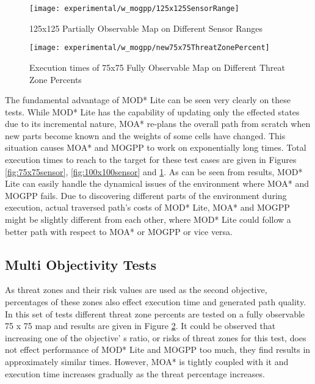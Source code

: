 \begin{figure}
\centering
\texttt{[image: experimental/w\_mogpp/125x125SensorRange]}
\caption{125x125 Partially Observable Map on Different Sensor Ranges}
\label{fig:125x125sensor}
\end{figure}

\begin{figure}
\centering
\texttt{[image: experimental/w\_mogpp/new75x75ThreatZonePercent]}
\caption{Execution times of 75x75 Fully Observable Map on Different Threat Zone Percents}
\label{fig:tzratio}
\end{figure}


The fundamental advantage of MOD* Lite can be seen very clearly on these tests. While MOD* Lite has the capability of updating only the effected states due to its incremental nature, MOA* re-plans the overall path from scratch when new parts become known and the weights of some cells have changed. This situation causes MOA* and MOGPP to work on exponentially long times. Total execution times to reach to the target for these test cases are given in Figures \ref{fig:75x75sensor}, \ref{fig:100x100sensor} and \ref{fig:125x125sensor}. As can be seen from results, MOD* Lite can easily handle the dynamical issues of the environment where MOA* and MOGPP fails. Due to discovering different parts of the environment during execution, actual traversed path's costs of MOD* Lite, MOA* and MOGPP might be slightly different from each other, where MOD* Lite could follow a better path with respect to MOA* or MOGPP or vice versa.

\subsection{Multi Objectivity Tests}

As threat zones and their risk values are used as the second objective, percentages of these zones also effect execution time and generated path quality. In this set of tests different threat zone percents are tested on a fully observable 75 x 75 map and results are given in Figure \ref{fig:tzratio}. It could be observed that increasing one of the objective' s ratio, or risks of threat zones for this test, does not effect performance of  MOD* Lite and MOGPP too much, they find results in approximately similar times. However, MOA* is tightly coupled with it and execution time increases gradually as the threat percentage increases.